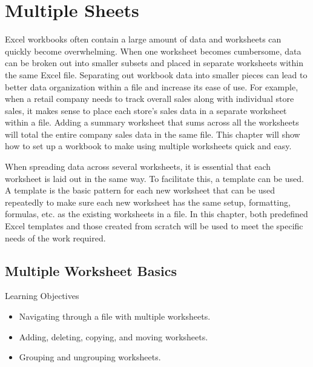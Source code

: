 \chapter{Multiple Sheets}\label{ch06:sheets}

Excel workbooks often contain a large amount of data and worksheets can quickly become overwhelming. When one worksheet becomes cumbersome, data can be broken out into smaller subsets and placed in separate worksheets within the same Excel file. Separating out workbook data into smaller pieces can lead to better data organization within a file and increase its ease of use. For example, when a retail company needs to track overall sales along with individual store sales, it makes sense to place each store's sales data in a separate worksheet within a file. Adding a summary worksheet that sums across all the worksheets will total the entire company sales data in the same file. This chapter will show how to set up a workbook to make using multiple worksheets quick and easy.

When spreading data across several worksheets, it is essential that each worksheet is laid out in the same way. To facilitate this, a template can be used. A template is the basic pattern for each new worksheet that can be used repeatedly to make sure each new worksheet has the same setup, formatting, formulas, etc. as the existing worksheets in a file. In this chapter, both predefined Excel templates and those created from scratch will be used to meet the specific needs of the work required.

\section{Multiple Worksheet Basics}

\begin{center}
	\begin{objbox}{Learning Objectives}
		\begin{itemize}
			\setlength{\itemsep}{0pt}
			\setlength{\parskip}{0pt}
			\setlength{\parsep}{0pt}
			
			\item Navigating through a file with multiple worksheets.
			\item Adding, deleting, copying, and moving worksheets.
			\item Grouping and ungrouping worksheets.

		\end{itemize}
	\end{objbox}
\end{center}

